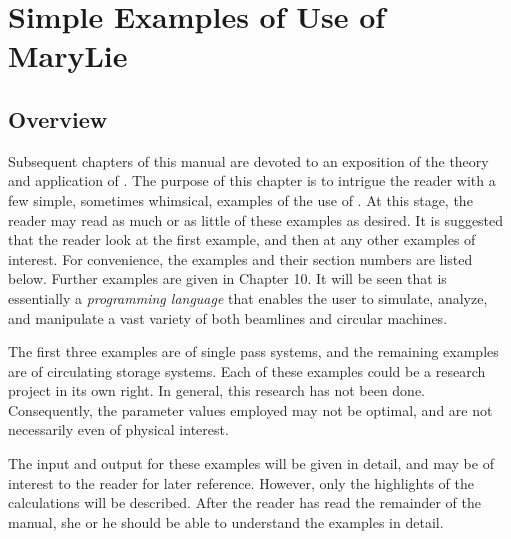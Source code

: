 
\chapter{Simple Examples of Use of MaryLie}

\section{Overview}
     Subsequent  chapters of this manual are devoted to an exposition of the theory and application of \Maryend.  The purpose of this chapter is to
intrigue the reader with a few simple, sometimes whimsical, examples of the
use of \Maryend.  At this stage, the reader may read as much or as little of
these examples as desired.  It is suggested that the reader look at the
first example, and then at any other examples of interest.  For
convenience, the examples and their section numbers are listed below.
Further examples are given in Chapter 10.  It
will be seen that \Mary is essentially a {\em programming language}
that enables the user to simulate, analyze, and manipulate a vast variety
of both beamlines and circular machines.


     The first three examples are of single pass systems, and the remaining
examples are of circulating storage systems.  Each of these examples could
be a research project in its own right.  In general, this research has not
been done.  Consequently, the parameter values employed may not be optimal,
and are not necessarily even of physical interest.

The  input and output for these examples will be given in detail,
and may be of interest to the reader for later reference.  However, only
the highlights of the calculations will be described.  After the reader
has read the remainder of the manual, she or he should be able to
understand the examples in detail.

